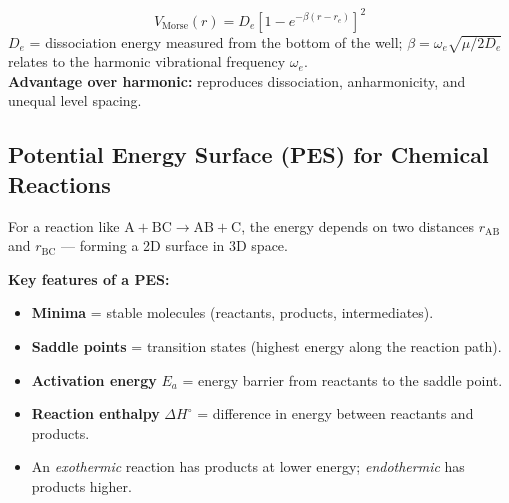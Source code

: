 \documentclass[12pt,a4paper]{article}
\begin{document}
\begin{tcolorbox}[formulabox, title={Morse Potential}]
\[
V_{\mathrm{Morse}}(r) = D_e\!\left[1-e^{-\beta(r-r_e)}\right]^2
\]
$D_e$ = dissociation energy measured from the bottom of the well; $\beta = \omega_e\sqrt{\mu/2D_e}$ relates to the harmonic vibrational frequency $\omega_e$.\\[2pt]
\textbf{Advantage over harmonic:} reproduces dissociation, anharmonicity, and unequal level spacing.
\end{tcolorbox}

\subsection{Potential Energy Surface (PES) for Chemical Reactions}
For a reaction like $\mathrm{A + BC \to AB + C}$, the energy depends on two distances $r_{\mathrm{AB}}$ and $r_{\mathrm{BC}}$ — forming a 2D surface in 3D space.

\begin{tcolorbox}[tikzbox, title={Reaction Path on a Potential Energy Surface}]
\centering
{}
\end{tcolorbox}

\textbf{Key features of a PES:}
\begin{itemize}[leftmargin=*, itemsep=2pt, topsep=2pt]
  \item \textbf{Minima} = stable molecules (reactants, products, intermediates).
  \item \textbf{Saddle points} = transition states (highest energy along the reaction path).
  \item \textbf{Activation energy} $E_a$ = energy barrier from reactants to the saddle point.
  \item \textbf{Reaction enthalpy} $\Delta H^\circ$ = difference in energy between reactants and products.
  \item An \emph{exothermic} reaction has products at lower energy; \emph{endothermic} has products higher.
\end{itemize}
\end{document}
